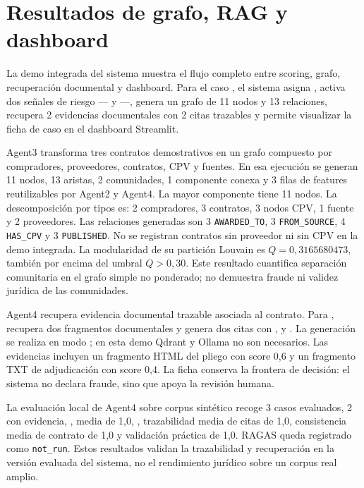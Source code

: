 \documentclass[11pt,a4paper,spanish]{book}
\numberwithin{equation}{chapter}
\numberwithin{figure}{chapter}
\begin{document}
\section{Resultados de grafo, RAG y dashboard}

La demo integrada del sistema muestra el flujo completo entre scoring, grafo, recuperaci{\'o}n
documental y dashboard. Para el caso , el sistema asigna
, activa dos se{\~n}ales de riesgo --- y
---, genera un grafo de 11 nodos y 13 relaciones, recupera 2
evidencias documentales con 2 citas trazables y permite visualizar la ficha de caso en el dashboard
Streamlit.

Agent3 transforma tres contratos demostrativos en un grafo compuesto por compradores, proveedores,
contratos, CPV y fuentes. En esa ejecuci{\'o}n se generan 11 nodos, 13 aristas, 2 comunidades, 1
componente conexa y 3 filas de features reutilizables por Agent2 y Agent4. La mayor componente tiene
11 nodos. La descomposici{\'o}n por tipos es: 2 compradores, 3 contratos, 3 nodos CPV, 1 fuente y 2
proveedores. Las relaciones generadas son 3 \texttt{AWARDED\_TO}, 3 \texttt{FROM\_SOURCE}, 4
\texttt{HAS\_CPV} y 3 \texttt{PUBLISHED}. No se registran contratos sin proveedor ni sin CPV en la
demo integrada. La modularidad de su partici{\'o}n Louvain es $Q=0{,}3165680473$, tambi{\'e}n por
encima del umbral $Q>0{,}30$. Este resultado cuantifica separaci{\'o}n comunitaria en el grafo simple
no ponderado; no demuestra fraude ni validez jur{\'i}dica de las comunidades.

Agent4 recupera evidencia documental trazable asociada al contrato. Para ,
recupera dos fragmentos documentales y genera dos citas con ,
 y . La generaci{\'o}n se realiza en modo
; en esta demo Qdrant y Ollama no son necesarios. Las evidencias
incluyen un fragmento HTML del pliego con score 0,6 y un fragmento TXT de adjudicaci{\'o}n con score
0,4. La ficha conserva la frontera de decisi{\'o}n: el sistema no declara fraude, sino que apoya la
revisi{\'o}n humana.

La evaluaci{\'o}n local de Agent4 sobre corpus sint{\'e}tico recoge 3 casos evaluados, 2 con evidencia,
,  media de 1,0,
, trazabilidad media de citas de 1,0, consistencia media de
contrato de 1,0 y validaci{\'o}n pr{\'a}ctica de 1,0. RAGAS queda registrado como \texttt{not\_run}.
Estos resultados validan la trazabilidad y recuperaci{\'o}n en la versi{\'o}n evaluada del sistema, no
el rendimiento jur{\'i}dico sobre un corpus real amplio.
\end{document}
